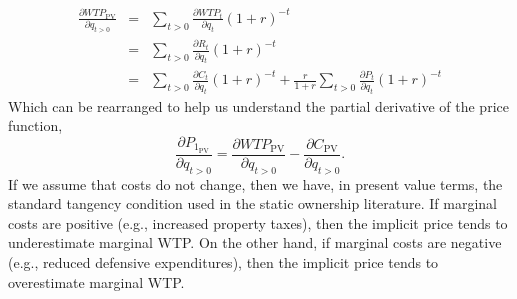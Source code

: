 \documentclass[ecta,nameyear,draft]{econsocart}
\theoremstyle{plain}
\theoremstyle{remark}
\begin{document}
\begin{eqnarray}
\frac{\partial \mathit{WTP}_{\mathrm{PV}}}{\partial q_{t>0}}&=&\sum_{t>0} \frac{\partial \mathit{WTP}_t}{\partial q_t}(1+r)^{-t}\label{pvmwtp}\nonumber\\ 
&=&\sum_{t>0} \frac{\partial R_t}{\partial q_t}(1+r)^{-t}\nonumber\\
&=&\sum_{t>0} \frac{\partial C_t}{\partial q_t}(1+r)^{-t}+\frac{r}{1+r}\sum_{t>0} \frac{\partial P_t}{\partial q_t}(1+r)^{-t}\nonumber
\end{eqnarray}
Which can be rearranged to help us understand the partial derivative of the price function,
\begin{equation}
	\frac{\partial P_{1_{\mathrm{PV}}}} {\partial q_{t>0}}=\frac{\partial \mathit{WTP}_{\mathrm{PV}}}{\partial q_{t>0}}-\frac{\partial C_{\mathrm{PV}}}{\partial q_{t>0}} \label{marginalPrice}.
\end{equation}
If we assume that costs do not change, then we have, in present value terms, the standard tangency condition used in the static ownership literature. If marginal costs are positive (e.g., increased property taxes), then the implicit price tends to underestimate marginal WTP. On the other hand, if marginal costs are negative (e.g., reduced defensive expenditures), then the implicit price tends to overestimate marginal WTP.
\end{document}
